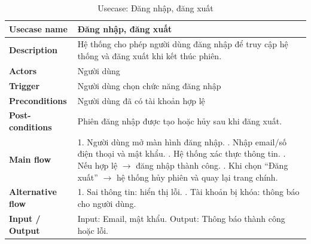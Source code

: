 \begingroup
\renewcommand{\arraystretch}{1.25}
\begin{longtable}{|p{4cm}|p{10cm}|}
\caption{Usecase: Đăng nhập, đăng xuất} \\
\endfirsthead

\endhead

\endfoot

\endlastfoot

\hline

\textbf{Usecase name} &
Đăng nhập, đăng xuất \\
\hline

\textbf{Description} &
Hệ thống cho phép người dùng đăng nhập để truy cập hệ thống và đăng xuất khi kết thúc phiên. \\
\hline

\textbf{Actors} &
Người dùng \\
\hline

\textbf{Trigger} &
Người dùng chọn chức năng đăng nhập \\
\hline

\textbf{Preconditions} &
Người dùng đã có tài khoản hợp lệ \\
\hline

\textbf{Post-conditions} &
Phiên đăng nhập được tạo hoặc hủy sau khi đăng xuất. \\
\hline

\textbf{Main flow} &
1. Người dùng mở màn hình đăng nhập. \newline 2. Nhập email/số điện thoại và mật khẩu. \newline 3. Hệ thống xác thực thông tin. \newline 4. Nếu hợp lệ $\rightarrow$ đăng nhập thành công. \newline 5. Khi chọn ``Đăng xuất'' $\rightarrow$ hệ thống hủy phiên và quay lại trang chính. \\
\hline

\textbf{Alternative flow} &
1. Sai thông tin: hiển thị lỗi. \newline 2. Tài khoản bị khóa: thông báo cho người dùng. \\
\hline

\textbf{Input / Output} &
Input: Email, mật khẩu. \newline Output: Thông báo thành công hoặc lỗi. \\
\hline

\end{longtable}
\endgroup



